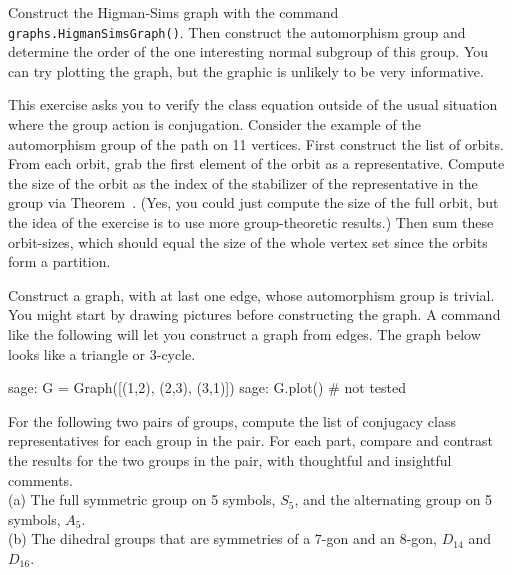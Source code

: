 \begin{sageverbatim}\end{sageverbatim}
%
%
Construct the Higman-Sims graph with the command \verb?graphs.HigmanSimsGraph()?.  Then construct the automorphism group and determine the order of the one interesting normal subgroup of this group.  You can try plotting the graph, but the graphic is unlikely to be very informative.
\begin{sageverbatim}\end{sageverbatim}
%
%
This exercise asks you to verify the class equation outside of the usual situation where the group action is conjugation.  Consider the example of the automorphism group of the path on 11 vertices.  First construct the list of orbits.  From each orbit, grab the first element of the orbit as a representative.  Compute the size of the orbit as the index of the stabilizer of the representative in the group via Theorem~.  (Yes, you could just compute the size of the full orbit, but the idea of the exercise is to use more group-theoretic results.)  Then sum these orbit-sizes, which should equal the size of the whole vertex set since the orbits form a partition.
\begin{sageverbatim}\end{sageverbatim}
%
%
Construct a graph, with at last one edge, whose automorphism group is trivial.  You might start by drawing pictures before constructing the graph.  A command like the following will let you construct a graph from edges.  The graph below looks like a triangle or $3$-cycle.
%
\begin{sageexample}
sage: G = Graph([(1,2), (2,3), (3,1)])
sage: G.plot()            # not tested
\end{sageexample}
%
\begin{sageverbatim}\end{sageverbatim}
%
%
For the following two pairs of groups, compute the list of conjugacy class representatives for each group in the pair.  For each part, compare and contrast the results for the two groups in the pair, with thoughtful and insightful comments.\\
(a) The full symmetric group on 5 symbols, $S_5$, and the alternating group on 5 symbols, $A_5$.\\
(b) The dihedral groups that are symmetries of a $7$-gon and an $8$-gon, $D_{14}$ and $D_{16}$.
\begin{sageverbatim}\end{sageverbatim}
